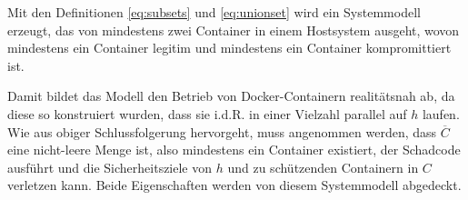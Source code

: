 \documentclass[../main.tex]{subfiles}
\begin{document}

    Mit den Definitionen \ref{eq:subsets} und \ref{eq:unionset} wird ein Systemmodell erzeugt, das von mindestens zwei Container in einem Hostsystem ausgeht, wovon mindestens ein Container \cvalid{} legitim und mindestens ein Container \cbroken{} kompromittiert ist.

    Damit bildet das Modell den Betrieb von Docker-Containern realitätsnah ab, da diese so konstruiert wurden, dass sie i.d.R. in einer Vielzahl parallel auf \(h\) laufen. Wie aus obiger Schlussfolgerung hervorgeht, muss angenommen werden, dass \(\overline{C}\) eine nicht-leere Menge ist, also mindestens ein Container \cbroken{} existiert, der Schadcode ausführt und die Sicherheitsziele von \(h\) und zu schützenden Containern in \(C\) verletzen kann. Beide Eigenschaften werden von diesem Systemmodell abgedeckt.


\end{document}
